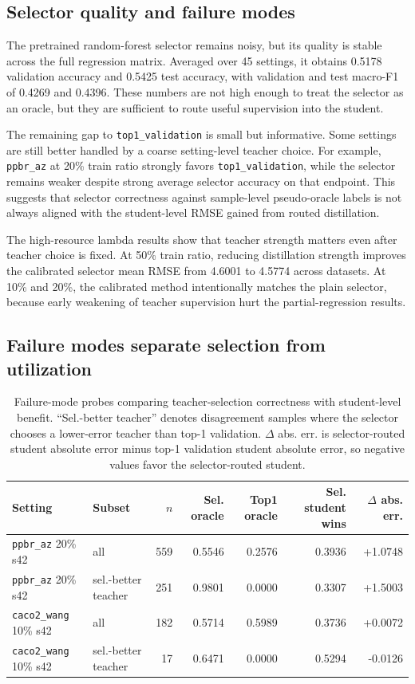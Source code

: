 \documentclass[11pt]{article}
\begin{document}
\subsection{Selector quality and failure modes}

The pretrained random-forest selector remains noisy, but its quality is stable
across the full regression matrix. Averaged over 45 settings, it obtains 0.5178
validation accuracy and 0.5425 test accuracy, with validation and test
macro-F1 of 0.4269 and 0.4396. These numbers are not high enough to treat the
selector as an oracle, but they are sufficient to route useful supervision into
the student.

The remaining gap to \texttt{top1\_validation} is small but informative. Some
settings are still better handled by a coarse setting-level teacher choice.
For example, \texttt{ppbr\_az} at 20\% train ratio strongly favors
\texttt{top1\_validation}, while the selector remains weaker despite strong
average selector accuracy on that endpoint. This suggests that selector
correctness against sample-level pseudo-oracle labels is not always aligned
with the student-level RMSE gained from routed distillation.

The high-resource lambda results show that teacher strength matters even after
teacher choice is fixed. At 50\% train ratio, reducing distillation strength
improves the calibrated selector mean RMSE from 4.6001 to 4.5774 across
datasets. At 10\% and 20\%, the calibrated method intentionally matches the
plain selector, because early weakening of teacher supervision hurt the
partial-regression results.

\subsection{Failure modes separate selection from utilization}

\begin{table}[H]
\centering
\small
\setlength{\tabcolsep}{3pt}
\begin{tabular}{llrrrrr}
\toprule
Setting & Subset & \(n\) & Sel. oracle & Top1 oracle & Sel. student wins & \(\Delta\) abs. err. \\
\midrule
\texttt{ppbr\_az} 20\% s42 & all & 559 & 0.5546 & 0.2576 & 0.3936 & +1.0748 \\
\texttt{ppbr\_az} 20\% s42 & sel.-better teacher & 251 & 0.9801 & 0.0000 & 0.3307 & +1.5003 \\
\texttt{caco2\_wang} 10\% s42 & all & 182 & 0.5714 & 0.5989 & 0.3736 & +0.0072 \\
\texttt{caco2\_wang} 10\% s42 & sel.-better teacher & 17 & 0.6471 & 0.0000 & 0.5294 & -0.0126 \\
\bottomrule
\end{tabular}
\caption{Failure-mode probes comparing teacher-selection correctness with
student-level benefit. ``Sel.-better teacher'' denotes disagreement samples
where the selector chooses a lower-error teacher than top-1 validation.
\(\Delta\) abs. err. is selector-routed student absolute error minus
top-1 validation student absolute error, so negative values favor the
selector-routed student.}
\label{tab:failure_probe}
\end{table}
\end{document}
